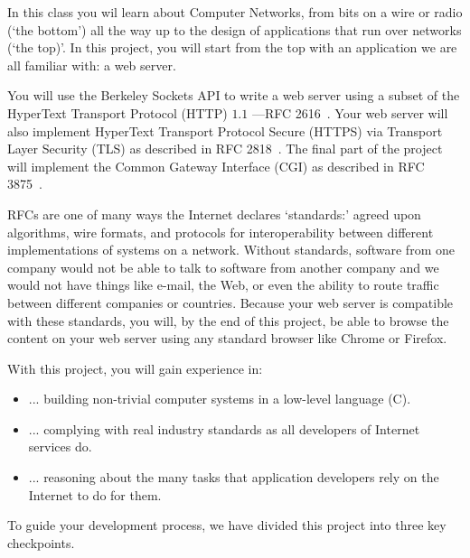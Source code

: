 In this class you wil learn about Computer Networks, from bits on a wire or radio (`the bottom') all the way up to the design of applications that run over networks (`the top)'. 
In this project, you will start from the top with an application we are all familiar with: a web server.

You will use the Berkeley Sockets API to write a web
server using a subset of the HyperText Transport Protocol (HTTP) $1.1$ ---RFC 2616~\cite{httprfc}.  Your web server will also implement
HyperText Transport Protocol Secure (HTTPS) via Transport Layer Security (TLS)
as described in RFC 2818~\cite{httpsrfc}.  The final part of the project will
implement the Common Gateway Interface (CGI) as described in RFC
3875~\cite{cgirfc}.  

RFCs are one of many ways the Internet declares `standards:' agreed upon algorithms, wire formats, and protocols for interoperability between different implementations of systems on a network.
Without standards, software from one company would not be able to talk to software from another company and we would not have things like e-mail, the Web, or even the ability to route traffic between different companies or countries.
Because your web server is compatible with these standards, you will, by the end of this project, be able to browse the content on your web server using any standard browser like Chrome or Firefox.
 
\vspace{5pt}

\noindent With this project, you will gain experience in:
\begin{itemize}
  \item ... building non-trivial computer systems in a low-level language (C).
  \item ... complying with real industry standards as all developers of Internet services do.
  \item ... reasoning about the many tasks that application developers rely on the Internet to do for them.
\end{itemize}

\noindent To guide your development process, we have divided this project into three key checkpoints.
